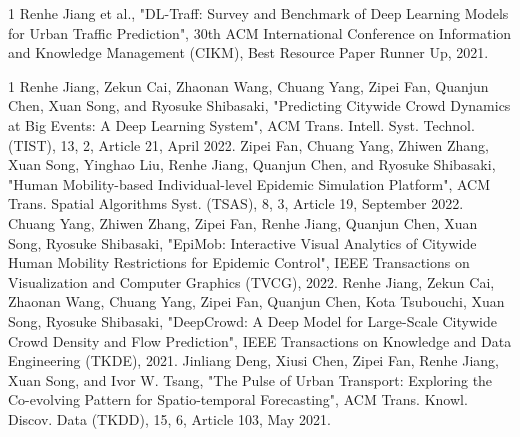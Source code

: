 \begin{受賞}{1}
Renhe Jiang et al., "DL-Traff: Survey and Benchmark of Deep Learning Models for Urban Traffic Prediction", 30th ACM International Conference on Information and Knowledge Management (CIKM), Best Resource Paper Runner Up, 2021.
\end{受賞}
\begin{雑誌論文}{1}
Renhe Jiang, Zekun Cai, Zhaonan Wang, Chuang Yang, Zipei Fan, Quanjun Chen, Xuan Song, and Ryosuke Shibasaki, "Predicting Citywide Crowd Dynamics at Big Events: A Deep Learning System", ACM Trans. Intell. Syst. Technol. (TIST), 13, 2, Article 21, April 2022.
Zipei Fan, Chuang Yang, Zhiwen Zhang, Xuan Song, Yinghao Liu, Renhe Jiang, Quanjun Chen, and Ryosuke Shibasaki, "Human Mobility-based Individual-level Epidemic Simulation Platform", ACM Trans. Spatial Algorithms Syst. (TSAS), 8, 3, Article 19, September 2022.
Chuang Yang, Zhiwen Zhang, Zipei Fan, Renhe Jiang, Quanjun Chen, Xuan Song, Ryosuke Shibasaki, "EpiMob: Interactive Visual Analytics of Citywide Human Mobility Restrictions for Epidemic Control", IEEE Transactions on Visualization and Computer Graphics (TVCG), 2022.
Renhe Jiang, Zekun Cai, Zhaonan Wang, Chuang Yang, Zipei Fan, Quanjun Chen, Kota Tsubouchi, Xuan Song, Ryosuke Shibasaki, "DeepCrowd: A Deep Model for Large-Scale Citywide Crowd Density and Flow Prediction", IEEE Transactions on Knowledge and Data Engineering (TKDE), 2021.
Jinliang Deng, Xiusi Chen, Zipei Fan, Renhe Jiang, Xuan Song, and Ivor W. Tsang, "The Pulse of Urban Transport: Exploring the Co-evolving Pattern for Spatio-temporal Forecasting", ACM Trans. Knowl. Discov. Data (TKDD), 15, 6, Article 103, May 2021.
\end{雑誌論文}

